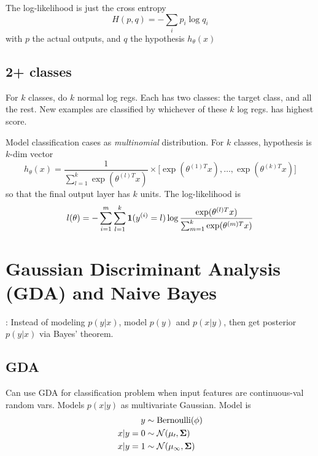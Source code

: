 \documentclass[11pt]{article}
\begin{document}
The log-likelihood is just the cross entropy
\begin{equation}
  H(p,q) = -\sum_i p_i \log q_i
\end{equation}
with $p$ the actual outputs, and $q$ the hypothesis $h_\theta(x)$

\subsection{2+ classes}

 For $k$ classes, do $k$ normal log regs. Each has two classes: the
target class, and all the rest. New examples are classified by whichever of these $k$
log regs. has highest score.

 Model classification cases as \emph{multinomial}
distribution. For $k$ classes, hypothesis is $k$-dim vector
\begin{equation}
  h_\theta (x) = \frac{1}{\sum_{l=1}^k \exp(\theta^{(l)T} x)} \times
  \big[\exp(\theta^{(1)T} x), \dots, \exp(\theta^{(k)T} x)\big] 
\end{equation}
so that the final output layer has $k$ units. The log-likelihood is
\begin{equation}
  l(\theta) = - \sum_{i=1}^m \sum_{l=1}^k \mathbf{1}(y^{(i)} = l)
  \log \frac{\exp(\theta^{(l)T} x)}{\sum_{m=1}^k \exp(\theta^{(m)T} x)} 
\end{equation}




\section{Gaussian Discriminant Analysis (GDA) and Naive Bayes}
\label{sec:GDA_nbayes}
: Instead of modeling $p(y|x)$, model $p(y)$ and $p(x|y)$,
then get posterior $p(y|x)$ via Bayes' theorem.

\subsection{GDA}
Can use GDA for classification problem when input features are continuous-val random
vars. Models $p(x|y)$ as multivariate Gaussian. Model is
\begin{align}
  y     &\sim \textrm{Bernoulli}(\phi) \nonumber\\
  x|y=0 &\sim \mathcal{N(\mu_0, \boldsymbol{\Sigma})} \nonumber\\
  x|y=1 &\sim \mathcal{N(\mu_1, \boldsymbol{\Sigma})}
\end{align}
\end{document}
